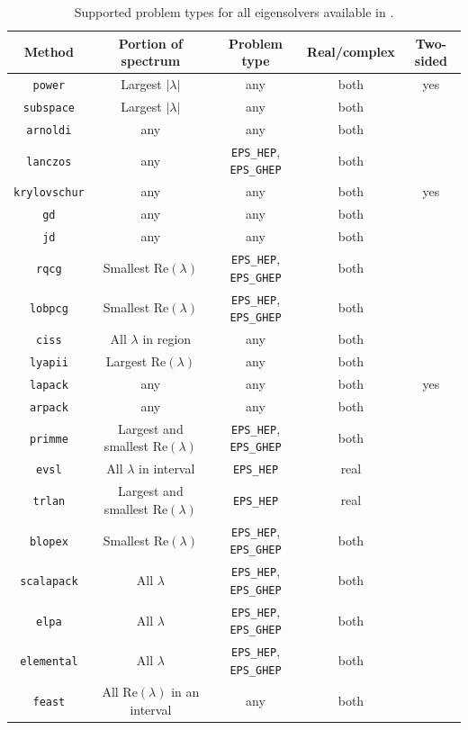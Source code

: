 \begin{table}[t]
\centering
\begin{tabular}{ccccc} \hline
Method   &  Portion of spectrum & Problem type & \!Real/complex\! & \!Two-sided\!\\ \hline
\texttt{power}       & Largest $|\lambda|$ & any & both & yes\\
\texttt{subspace}    & Largest $|\lambda|$ & any & both & \\
\texttt{arnoldi}     & any    & any & both & \\
\texttt{lanczos}     & any    & \Verb!EPS_HEP!, \Verb!EPS_GHEP! & both & \\
\!\texttt{krylovschur}\! & any    & any & both & yes \\
\texttt{gd}          & any    & any & both & \\
\texttt{jd}          & any    & any & both & \\
\texttt{rqcg}        & Smallest $\mathrm{Re}(\lambda)$ & \Verb!EPS_HEP!, \Verb!EPS_GHEP! & both & \\
\texttt{lobpcg}      & Smallest $\mathrm{Re}(\lambda)$ & \Verb!EPS_HEP!, \Verb!EPS_GHEP! & both & \\
\texttt{ciss}        & All $\lambda$ in region & any & both & \\
\texttt{lyapii}      & Largest $\mathrm{Re}(\lambda)$ & any & both & \\
\hline
\texttt{lapack}      & any    & any & both & yes \\
\texttt{arpack}      & any    & any & both & \\
\texttt{primme}      & Largest and smallest $\mathrm{Re}(\lambda)$ & \Verb!EPS_HEP!, \Verb!EPS_GHEP! & both & \\
\texttt{evsl}        & All $\lambda$ in interval & \Verb!EPS_HEP! & real & \\
\texttt{trlan}       & Largest and smallest $\mathrm{Re}(\lambda)$ & \Verb!EPS_HEP! & real & \\
\texttt{blopex}      & Smallest $\mathrm{Re}(\lambda)$ & \Verb!EPS_HEP!, \Verb!EPS_GHEP! & both & \\
\texttt{scalapack}   & All $\lambda$ & \Verb!EPS_HEP!, \Verb!EPS_GHEP! & both & \\
\texttt{elpa}        & All $\lambda$ & \Verb!EPS_HEP!, \Verb!EPS_GHEP! & both & \\
\texttt{elemental}   & All $\lambda$ & \Verb!EPS_HEP!, \Verb!EPS_GHEP! & both & \\
\texttt{feast}       & All $\mathrm{Re}(\lambda)$ in an interval & any & both & \\ \hline
\end{tabular}
\caption{\label{tab:support}Supported problem types for all eigensolvers available in \slepc.}
\end{table}

